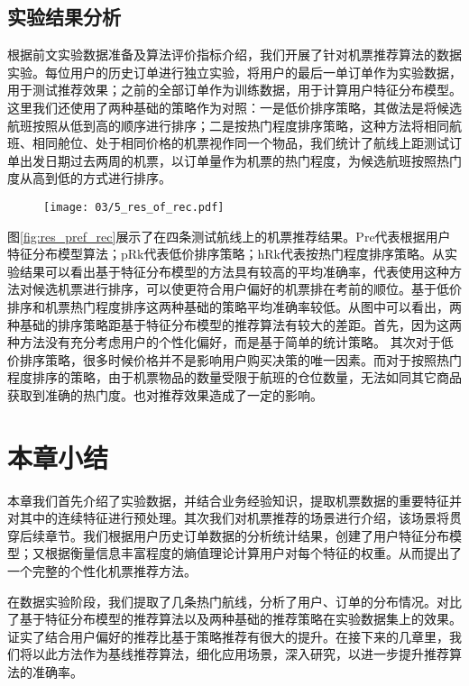 \subsection{实验结果分析}

根据前文实验数据准备及算法评价指标介绍，我们开展了针对机票推荐算法的数据实验。每位用户的历史订单进行独立实验，将用户的最后一单订单作为实验数据，用于测试推荐效果；之前的全部订单作为训练数据，用于计算用户特征分布模型。这里我们还使用了两种基础的策略作为对照：一是低价排序策略，其做法是将候选航班按照从低到高的顺序进行排序；二是按热门程度排序策略，这种方法将相同航班、相同舱位、处于相同价格的机票视作同一个物品，我们统计了航线上距测试订单出发日期过去两周的机票，以订单量作为机票的热门程度，为候选航班按照热门度从高到低的方式进行排序。

\begin{figure}
 \centering
 \texttt{[image: 03/5\_res\_of\_rec.pdf]}
\end{figure}

图\ref{fig:res_pref_rec}展示了在四条测试航线上的机票推荐结果。Pre代表根据用户特征分布模型算法；pRk代表低价排序策略；hRk代表按热门程度排序策略。从实验结果可以看出基于特征分布模型的方法具有较高的平均准确率，代表使用这种方法对候选机票进行排序，可以使更符合用户偏好的机票排在考前的顺位。基于低价排序和机票热门程度排序这两种基础的策略平均准确率较低。从图中可以看出，两种基础的排序策略距基于特征分布模型的推荐算法有较大的差距。首先，因为这两种方法没有充分考虑用户的个性化偏好，而是基于简单的统计策略。
其次对于低价排序策略，很多时候价格并不是影响用户购买决策的唯一因素。而对于按照热门程度排序的策略，由于机票物品的数量受限于航班的仓位数量，无法如同其它商品获取到准确的热门度。也对推荐效果造成了一定的影响。


\section{本章小结}
本章我们首先介绍了实验数据，并结合业务经验知识，提取机票数据的重要特征并对其中的连续特征进行预处理。其次我们对机票推荐的场景进行介绍，该场景将贯穿后续章节。我们根据用户历史订单数据的分析统计结果，创建了用户特征分布模型；又根据衡量信息丰富程度的熵值理论计算用户对每个特征的权重。从而提出了一个完整的个性化机票推荐方法。

在数据实验阶段，我们提取了几条热门航线，分析了用户、订单的分布情况。对比了基于特征分布模型的推荐算法以及两种基础的推荐策略在实验数据集上的效果。证实了结合用户偏好的推荐比基于策略推荐有很大的提升。在接下来的几章里，我们将以此方法作为基线推荐算法，细化应用场景，深入研究，以进一步提升推荐算法的准确率。